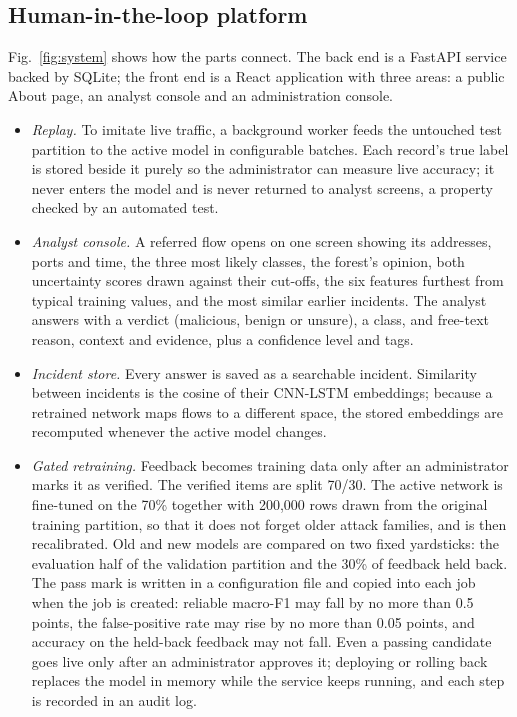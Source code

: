 \documentclass[conference]{IEEEtran}
\begin{document}
\subsection{Human-in-the-loop platform}
Fig.~\ref{fig:system} shows how the parts connect. The back end is a FastAPI service backed by
SQLite; the front end is a React application with three areas: a public About page, an analyst
console and an administration console.
\begin{itemize}
\item \textit{Replay.} To imitate live traffic, a background worker feeds the untouched test
partition to the active model in configurable batches. Each record's true label is stored beside
it purely so the administrator can measure live accuracy; it never enters the model and is never
returned to analyst screens, a property checked by an automated test.
\item \textit{Analyst console.} A referred flow opens on one screen showing its addresses, ports
and time, the three most likely classes, the forest's opinion, both uncertainty scores drawn
against their cut-offs, the six features furthest from typical training values, and the most
similar earlier incidents. The analyst answers with a verdict (malicious, benign or unsure), a
class, and free-text reason, context and evidence, plus a confidence level and tags.
\item \textit{Incident store.} Every answer is saved as a searchable incident. Similarity between
incidents is the cosine of their CNN-LSTM embeddings; because a retrained network maps flows to a
different space, the stored embeddings are recomputed whenever the active model changes.
\item \textit{Gated retraining.} Feedback becomes training data only after an administrator marks
it as verified. The verified items are split 70/30. The active network is fine-tuned on the 70\%
together with 200,000 rows drawn from the original training partition, so that it does not forget
older attack families, and is then recalibrated. Old and new models are compared on two fixed
yardsticks: the evaluation half of the validation partition and the 30\% of feedback held back.
The pass mark is written in a configuration file and copied into each job when the job is
created: reliable macro-F1 may fall by no more than 0.5 points, the false-positive rate may rise
by no more than 0.05 points, and accuracy on the held-back feedback may not fall. Even a passing
candidate goes live only after an administrator approves it; deploying or rolling back replaces
the model in memory while the service keeps running, and each step is recorded in an audit log.
\end{itemize}
\end{document}
